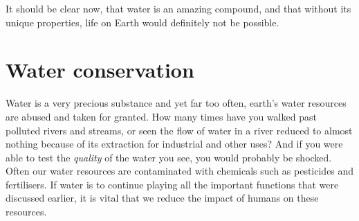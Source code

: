 It should be clear now, that water is an amazing compound, and that without its unique properties, life on Earth would definitely not be possible.








\section{Water conservation}

Water is a very precious substance and yet far too often, earth's water resources are abused and taken for granted. How many times have you walked past polluted rivers and streams, or seen the flow of water in a river reduced to almost nothing because of its extraction for industrial and other uses? And if you were able to test the \textit{quality} of the water you see, you would probably be shocked. Often our water resources are contaminated with chemicals such as pesticides and fertilisers. If water is to continue playing all the important functions that were discussed earlier, it is vital that we reduce the impact of humans on these resources.

